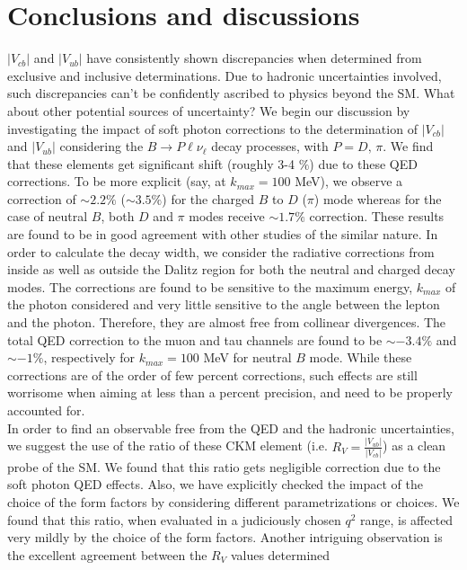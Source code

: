 \documentclass[a4paper,11pt]{article}
\begin{document}
 \section{Conclusions and discussions}
	 \label{sec5}
	 $|V_{cb}|$ and $|V_{ub}|$ have consistently shown discrepancies when determined from exclusive and inclusive determinations. Due to
	 hadronic uncertainties involved, such discrepancies can't be confidently ascribed to physics beyond the SM. What about other
	 potential sources of uncertainty?  
	 We begin our discussion by investigating the impact of soft photon corrections to the determination of $|V_{cb}|$ and $|V_{ub}|$ 
	 considering the $B \rightarrow P \ell \nu_\ell$ decay processes, with $P=D,\,\pi$. We find that these elements get significant 
	 shift (roughly 3-4 $\%$) due to these QED corrections. To be more explicit (say, at $k_{max}=100$ MeV), we observe a correction of $\sim 2.2\%$ ($\sim 3.5\%$) for the charged $B$ to $D$ ($\pi$) mode whereas  for the case of neutral $B$, both $D$ and $\pi$ modes receive $\sim 1.7\%$ correction. These results are found to be in good agreement with other studies of the similar
	 nature.
	 In order to calculate the decay width, 
	 we consider the radiative corrections from inside as well as outside the Dalitz region for both the neutral and charged decay modes.
	 The corrections are found to be sensitive to the maximum energy, $k_{max}$ of the photon considered and very little sensitive to the 
	 angle between the lepton and the photon. Therefore, they are almost free from collinear divergences. The total QED correction
	 to the muon and tau channels are found to be $\sim -3.4\%$ and $\sim -1\%$, respectively for $k_{max} = 100$ MeV for neutral $B$ mode. While these corrections
	 are of the order of few percent corrections, such effects are still worrisome when aiming at less than a percent precision, and need to be
	 properly accounted for.\\
	 In order to find an observable free from the QED and the hadronic uncertainties, we suggest the use of the ratio of these CKM element 
	 (i.e. $R_V = \frac{|V_{ub}|}{|V_{cb}|}$) as a clean probe of the SM. We found that this ratio gets negligible correction due 
	 to the soft photon QED effects. Also, we have explicitly checked the impact of the choice of the form factors by considering different parametrizations or
	 choices. We found that this ratio, when evaluated in a judiciously chosen $q^2$ range, is affected very mildly 
	 by the choice of the form factors. Another intriguing observation is the excellent agreement between the $R_V$ values determined
\end{document}
